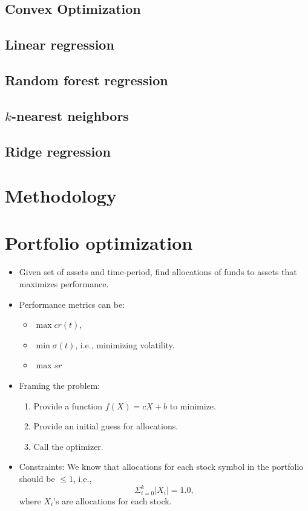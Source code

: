 \documentclass[12pt]{article}
\begin{document}
\begin{itemize}
\subsection{Convex Optimization}
\label{sec:convex}

\subsection{Linear regression}
\label{sec:lr}

\subsection{Random forest regression}
\label{sec:rfr}

\subsection{$k$-nearest neighbors}
\label{sec:knn}

\subsection{Ridge regression}
\label{sec:rr}

\section{Methodology}
\label{sec:method}



\section{Portfolio optimization}
\label{sec:opt}

\begin{itemize}
\item Given set of assets and time-period, find allocations of funds to assets that maximizes performance.
\item Performance metrics can be:
\begin{itemize}
\item $\max cr(t)$,
\item $\min \sigma(t)$, i.e., minimizing volatility.
\item $\max sr$
\end{itemize}
\item Framing the problem:
\begin{enumerate}
\item Provide a function $f(X)=cX+b$ to minimize.
\item Provide an initial guess for allocations.
\item Call the optimizer.
\end{enumerate}
\item Constraints: We know that allocations for each stock symbol in the portfolio should be $\leq 1$, i.e.,
\[ \Sigma_{i=0}^{k} |X_i|=1.0,
	\]
where $X_i$'s are allocations for each stock.
\end{itemize}


\end{itemize}
\end{document}
